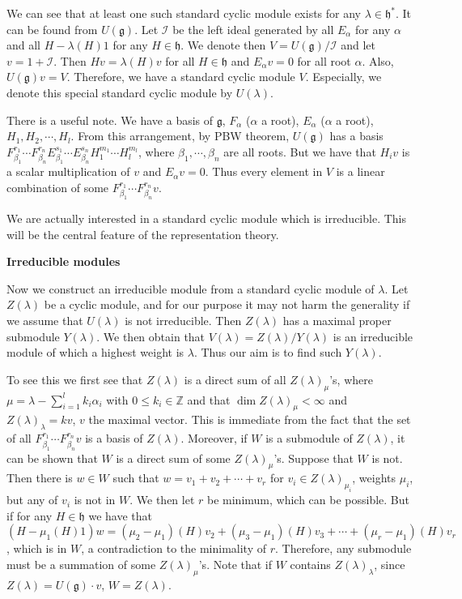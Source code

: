\documentclass{article}
\newcommand{\InZ}{\mathbb{Z}}
\newcommand{\lie}[1]{\mathfrak{#1}}
\begin{document}
We can see that at least one such standard cyclic module exists for any $\lambda \in \lie{h}^*$.
It can be found from $U(\lie{g})$.
Let $\mathcal{I}$ be the left ideal generated by all $E_\alpha$ for any $\alpha$ and all $H - \lambda(H) 1$ for any $H \in \lie{h}$.
We denote then $V = U(\lie{g})/\mathcal{I}$ and let $v = 1 + \mathcal{I}$.
Then $Hv = \lambda(H) v$ for all $H \in \lie{h}$ and $E_\alpha v = 0$ for all root $\alpha$.
Also, $U(\lie{g}) v = V$.
Therefore, we have a standard cyclic module $V$.
Especially, we denote this special standard cyclic module by $U(\lambda)$.

There is a useful note.
We have a basis of $\lie{g}$, $F_\alpha$ ($\alpha$ a root), $E_\alpha$ ($\alpha$ a root), $H_1, H_2, \cdots, H_l$.
From this arrangement, by PBW theorem, $U(\lie{g})$ has a basis $F_{\beta_1}^{r_1} \cdots F_{\beta_n}^{r_n} E_{\beta_1}^{s_1} \cdots E_{\beta_n}^{s_n} H_1^{m_1} \cdots H_l^{m_l}$, where $\beta_1, \cdots, \beta_n$ are all roots.
But we have that $H_i v$ is a scalar multiplication of $v$ and $E_\alpha v = 0$.
Thus every element in $V$ is a linear combination of some $F_{\beta_1}^{r_1} \cdots F_{\beta_n}^{r_n} v$.

We are actually interested in a standard cyclic module which is irreducible.
This will be the central feature of the representation theory.

\newpage

\textbf{Irreducible modules}

Now we construct an irreducible module from a standard cyclic module of $\lambda$.
Let $Z(\lambda)$ be a cyclic module, and for our purpose it may not harm the generality if we assume that $U(\lambda)$ is not irreducible.
Then $Z(\lambda)$ has a maximal proper submodule $Y(\lambda)$.
We then obtain that $V(\lambda) = Z(\lambda) / Y(\lambda)$ is an irreducible module of which a highest weight is $\lambda$.
Thus our aim is to find such $Y(\lambda)$.

To see this we first see that $Z(\lambda)$ is a direct sum of all $Z(\lambda)_\mu$'s, where $\mu = \lambda - \sum_{i = 1}^l k_i \alpha_i$ with $0 \le k_i \in \InZ$ and that $\dim{Z(\lambda)_\mu} < \infty$ and $Z(\lambda)_\lambda = kv$, $v$ the maximal vector.
This is immediate from the fact that the set of all $F_{\beta_1}^{r_1} \cdots F_{\beta_n}^{r_n} v$ is a basis of $Z(\lambda)$.
Moreover, if $W$ is a submodule of $Z(\lambda)$, it can be shown that $W$ is a direct sum of some $Z(\lambda)_\mu$'s.
Suppose that $W$ is not.
Then there is $w \in W$ such that $w = v_1 + v_2 + \cdots + v_r$ for $v_i \in Z(\lambda)_{\mu_i}$, weights $\mu_i$, but any of $v_i$ is not in $W$.
We then let $r$ be minimum, which can be possible.
But if for any $H \in \lie{h}$ we have that $(H - \mu_1(H) 1)w = (\mu_2 - \mu_1)(H) v_2 + (\mu_3 - \mu_1)(H) v_3 + \cdots + (\mu_r - \mu_1)(H) v_r$, which is in $W$, a contradiction to the minimality of $r$.
Therefore, any submodule must be a summation of some $Z(\lambda)_\mu$'s.
Note that if $W$ contains $Z(\lambda)_\lambda$, since $Z(\lambda) = U(\lie{g}) \cdot v$, $W = Z(\lambda)$.
\end{document}
